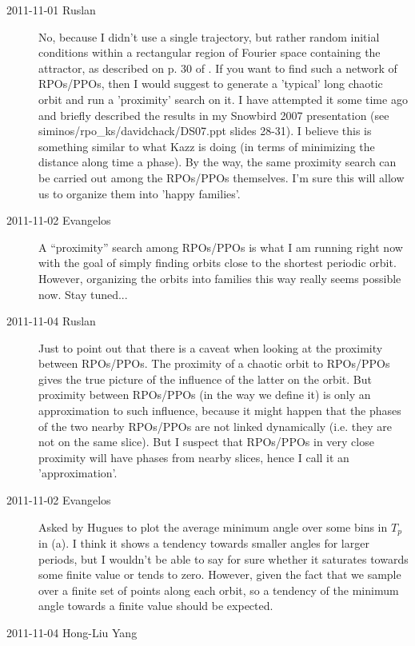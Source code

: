 \begin{description}
\item[2011-11-01 Ruslan] No, because I didn't use a single trajectory,
  but rather random initial conditions within a rectangular region of
  Fourier space containing the attractor, as described on p. 30 of
  . If you want to find such a network of RPOs/PPOs, then I would
  suggest to generate a 'typical' long chaotic orbit and run a 'proximity'
  search on it.  I have attempted it some time ago and briefly described
  the results in my Snowbird 2007 presentation (see
  siminos/rpo\_ks/davidchack/DS07.ppt slides 28-31).  I believe this is
  something similar to what Kazz is doing (in terms of minimizing the
  distance along time a phase).  By the way, the same proximity search can
  be carried out among the RPOs/PPOs themselves. I'm sure this will allow
  us to organize them into 'happy families'.

\item[2011-11-02 Evangelos] A ``proximity'' search among RPOs/PPOs is
  what I am running right now with the goal of simply finding orbits close
  to the shortest periodic orbit. However, organizing the orbits into
  families this way really seems possible now. Stay tuned...

\item[2011-11-04 Ruslan] Just to point out that there is a caveat when
  looking at the proximity between RPOs/PPOs.  The proximity of a chaotic
  orbit to RPOs/PPOs gives the true picture of the influence of the latter
  on the orbit. But proximity between RPOs/PPOs (in the way we define it)
  is only an approximation to such influence, because it might happen that
  the phases of the two nearby RPOs/PPOs are not linked dynamically (i.e.
  they are not on the same slice).  But I suspect that RPOs/PPOs in very
  close proximity will have phases from nearby slices, hence I call it an
  'approximation'.

\item[2011-11-02 Evangelos] Asked by Hugues to plot the average minimum
  angle over some bins in $T_p$ in (a). I
  think it shows a tendency towards smaller angles for larger periods, but
  I wouldn't be able to say for sure whether it saturates towards some
  finite value or tends to zero. However, given the fact that we sample
  over a finite set of points along each orbit, so a tendency of the
  minimum angle towards a finite value should be expected.

\item[2011-11-04  Hong-Liu Yang]
  

\end{description}
